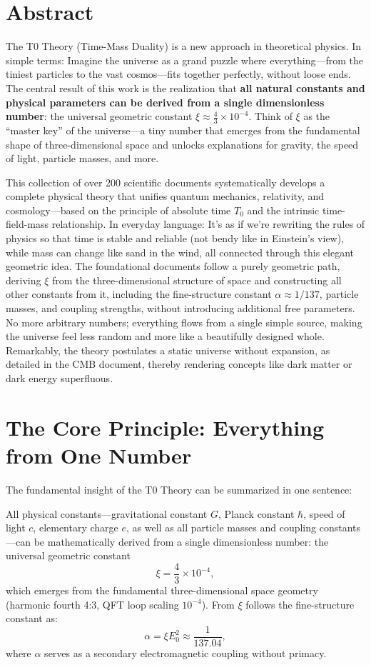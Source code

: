 \section*{Abstract}
		The T0 Theory (Time-Mass Duality) is a new approach in theoretical physics. In simple terms: Imagine the universe as a grand puzzle where everything—from the tiniest particles to the vast cosmos—fits together perfectly, without loose ends. The central result of this work is the realization that \textbf{all natural constants and physical parameters can be derived from a single dimensionless number}: the universal geometric constant $\xi \approx \frac{4}{3} \times 10^{-4}$. Think of $\xi$ as the ``master key'' of the universe—a tiny number that emerges from the fundamental shape of three-dimensional space and unlocks explanations for gravity, the speed of light, particle masses, and more.
		
		This collection of over 200 scientific documents systematically develops a complete physical theory that unifies quantum mechanics, relativity, and cosmology—based on the principle of absolute time $T_0$ and the intrinsic time-field-mass relationship. In everyday language: It's as if we're rewriting the rules of physics so that time is stable and reliable (not bendy like in Einstein's view), while mass can change like sand in the wind, all connected through this elegant geometric idea. The foundational documents follow a purely geometric path, deriving $\xi$ from the three-dimensional structure of space and constructing all other constants from it, including the fine-structure constant $\alpha \approx 1/137$, particle masses, and coupling strengths, without introducing additional free parameters. No more arbitrary numbers; everything flows from a single simple source, making the universe feel less random and more like a beautifully designed whole. Remarkably, the theory postulates a static universe without expansion, as detailed in the CMB document, thereby rendering concepts like dark matter or dark energy superfluous.

	
	\section{The Core Principle: Everything from One Number}
	
	The fundamental insight of the T0 Theory can be summarized in one sentence:
	
	\begin{keyresult}
		All physical constants—gravitational constant $G$, Planck constant $\hbar$, speed of light $c$, elementary charge $e$, as well as all particle masses and coupling constants—can be mathematically derived from a single dimensionless number: the universal geometric constant
		\[
		\xi = \frac{4}{3} \times 10^{-4},
		\]
		which emerges from the fundamental three-dimensional space geometry (harmonic fourth 4:3, QFT loop scaling $10^{-4}$).
		From $\xi$ follows the fine-structure constant as:
		\[
		\alpha = \xi E_0^2 \approx \frac{1}{137.04},
		\]
		where $\alpha$ serves as a secondary electromagnetic coupling without primacy.
	\end{keyresult}
	
